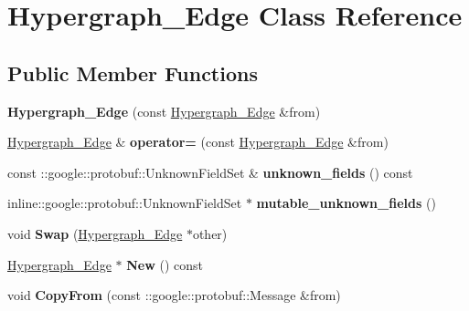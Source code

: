\hypertarget{classHypergraph__Edge}{
\section{Hypergraph\_\-Edge Class Reference}
\label{classHypergraph__Edge}
}
\subsection*{Public Member Functions}
\begin{DoxyCompactItemize}
\item 
\hypertarget{classHypergraph__Edge_ab108838f9bbf8f03991f762393082d85}{
{\bfseries Hypergraph\_\-Edge} (const \hyperlink{classHypergraph__Edge}{Hypergraph\_\-Edge} \&from)}
\label{classHypergraph__Edge_ab108838f9bbf8f03991f762393082d85}

\item 
\hypertarget{classHypergraph__Edge_a16e449f104fcdc9762db9654f7b4ccc2}{
\hyperlink{classHypergraph__Edge}{Hypergraph\_\-Edge} \& {\bfseries operator=} (const \hyperlink{classHypergraph__Edge}{Hypergraph\_\-Edge} \&from)}
\label{classHypergraph__Edge_a16e449f104fcdc9762db9654f7b4ccc2}

\item 
\hypertarget{classHypergraph__Edge_a423eb7f720ca17f4d8f061cdeb4bff1f}{
const ::google::protobuf::UnknownFieldSet \& {\bfseries unknown\_\-fields} () const }
\label{classHypergraph__Edge_a423eb7f720ca17f4d8f061cdeb4bff1f}

\item 
\hypertarget{classHypergraph__Edge_ab421c0d9bbba2cb1f190e7f2c9e13390}{
inline::google::protobuf::UnknownFieldSet $\ast$ {\bfseries mutable\_\-unknown\_\-fields} ()}
\label{classHypergraph__Edge_ab421c0d9bbba2cb1f190e7f2c9e13390}

\item 
\hypertarget{classHypergraph__Edge_a6042bf2bb2b6a7446926d17ea1b8fe1f}{
void {\bfseries Swap} (\hyperlink{classHypergraph__Edge}{Hypergraph\_\-Edge} $\ast$other)}
\label{classHypergraph__Edge_a6042bf2bb2b6a7446926d17ea1b8fe1f}

\item 
\hypertarget{classHypergraph__Edge_a262998f991bd7d5e69fe7b249995e321}{
\hyperlink{classHypergraph__Edge}{Hypergraph\_\-Edge} $\ast$ {\bfseries New} () const }
\label{classHypergraph__Edge_a262998f991bd7d5e69fe7b249995e321}

\item 
\hypertarget{classHypergraph__Edge_a0f781d1a4bdef9ac8d60e93a5f7c2ec3}{
void {\bfseries CopyFrom} (const ::google::protobuf::Message \&from)}
\label{classHypergraph__Edge_a0f781d1a4bdef9ac8d60e93a5f7c2ec3}


\end{DoxyCompactItemize}
